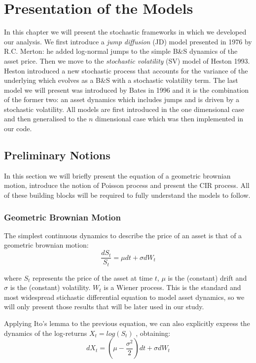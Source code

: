 \chapter{Presentation of the Models}
\label{chpr:models}
In this chapter we will present the stochastic frameworks in which we developed our analysis. We first introduce a \textit{jump diffusion} (JD) model presented in 1976 by R.C. Merton: he added log-normal jumps to the simple B\&S dynamics of the asset price. Then we move to the \textit{stochastic volatility} (SV) model of Heston 1993. Heston introduced a new stochastic process that accounts for the variance of the underlying which evolves as a B\&S  with a stochastic volatility term.
The last model we will present was introduced by Bates in 1996 and it is the combination of the former two: an asset dynamics which includes jumps and is driven by a stochastic volatility.
All models are first introduced in the one dimensional case and then generalised to the $n$ dimensional case which was then implemented in our code.

\bigskip

\section{Preliminary Notions}
\label{sec:notions}
In this section we will briefly present the equation of a geometric brownian motion, introduce the notion of Poisson process and present the 
CIR process. All of these building blocks will be required to fully understand the models to follow.


\subsection{Geometric Brownian Motion}
The simplest continuous dynamics to describe the price of an asset is that of a geometric brownian motion:
\begin{equation}
	\label{eq:GBM}
	\frac{dS_t}{S_t} = \mu dt + \sigma dW_t
\end{equation}

where $S_t$ represents the price of the asset at time $t$, $\mu$ is the (constant) drift and $\sigma$ is the (constant) volatility. $W_t$ is a Wiener process.
This is the standard and most widespread stichastic differential equation to model asset dynamics, so we will only present those results that will be later used in our study.


Applying Ito's lemma to the previous equation, we can also explicitly express the dynamics of the log-returns $X_t = log(S_t)$ , obtaining:
\begin{equation}
	dX_t = (\mu - 	\frac{\sigma^2}{2}) dt + \sigma dW_t
\end{equation}

